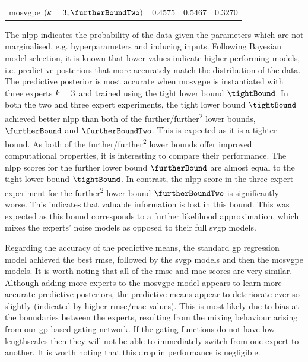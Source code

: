 \documentclass{mimosis-class/mimosis}
\numberwithin{equation}{chapter}
\newcommand{\modeInd}{\ensuremath{k}}
\newcommand{\ModeInd}{\ensuremath{\MakeUppercase{\modeInd}}}
\begin{document}
{\begin{table}[htbp]
\begin{tabular}{llll}
\acrshort{mosvgpe} \((k=3 ,\furtherBoundTwo)\) & \(0.4575\) & \(0.5467\) & \(0.3270\)\\
\end{tabular}
\end{table}
The \acrshort{nlpp} indicates the probability of the data given the
parameters which are not marginalised, e.g. hyperparameters and inducing inputs.
Following Bayesian model selection, it is known that lower values indicate higher performing models, i.e.
predictive posteriors that more accurately match the distribution of the data.
The predictive posterior is most accurate when \acrshort{mosvgpe} is instantiated with three experts \(\ModeInd=3\)
and trained using the tight lower bound \(\tightBound\).
In both the two and three expert experiments,
the tight lower bound \(\tightBound\) achieved better \acrshort{nlpp} than both of the further/further\textsuperscript{2}
lower bounds,  \(\furtherBound\) and \(\furtherBoundTwo\).
This is expected as it is a tighter bound.
As both of the further/further\textsuperscript{2} lower bounds offer improved computational properties,
it is interesting to compare their performance.
The \acrshort{nlpp} scores for the further lower bound \(\furtherBound\) are almost equal to the tight lower bound \(\tightBound\).
In contrast, the \acrshort{nlpp} score in the three expert experiment for the further\textsuperscript{2} lower bound \(\furtherBoundTwo\) is
significantly worse.
This indicates that valuable information is lost in this bound.
This was expected as this bound corresponds to a further likelihood approximation,
which mixes the experts' noise models as opposed to their full \acrshort{svgp} models.


Regarding the accuracy of the predictive means,
the standard \acrshort{gp} regression model achieved the best \acrshort{rmse}, followed by the \acrshort{svgp} models and then the
\acrshort{mosvgpe} models.
It is worth noting that all of the \acrshort{rmse} and \acrshort{mae} scores are very similar.
Although adding more experts to the \acrshort{mosvgpe} model appears to learn more accurate predictive posteriors, the
predictive means appear to deteriorate ever so slightly (indicated by higher \acrshort{rmse}/\acrshort{mae} values).
This is most likely due to bias at the boundaries between the experts,
resulting from the mixing behaviour arising from our \acrshort{gp}-based gating network.
If the gating functions do not have low lengthscales then they will not be able to immediately switch
from one expert to another.
It is worth noting that this drop in performance is negligible.

}
\end{document}
